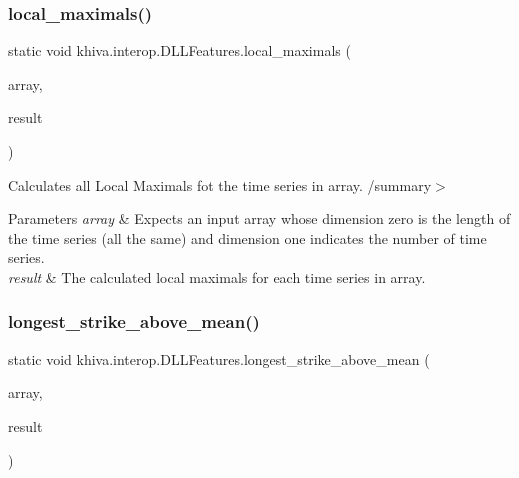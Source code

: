 \mbox{\label{classkhiva_1_1interop_1_1_d_l_l_features_a2da29b6a1c0287cb219a6a4731ce3850}} 
\subsubsection{\texorpdfstring{local\+\_\+maximals()}{local\_maximals()}}
{\footnotesize\ttfamily static void khiva.\+interop.\+D\+L\+L\+Features.\+local\+\_\+maximals (\begin{DoxyParamCaption}\item[{\mbox{[}\+In\mbox{]} ref Int\+Ptr}]{array,  }\item[{\mbox{[}\+Out\mbox{]} out Int\+Ptr}]{result }\end{DoxyParamCaption})\hspace{0.3cm}{\ttfamily [static]}}



Calculates all Local Maximals fot the time series in array. /summary$>$ 
\begin{DoxyParams}{Parameters}
{\em array} & Expects an input array whose dimension zero is the length of the time series (all the same) and dimension one indicates the number of time series.\\
\hline
{\em result} & The calculated local maximals for each time series in array.\\
\hline
\end{DoxyParams}


\mbox{\label{classkhiva_1_1interop_1_1_d_l_l_features_a5f10b0f0c8a164e833332bf8dadc4be8}} 
\subsubsection{\texorpdfstring{longest\+\_\+strike\+\_\+above\+\_\+mean()}{longest\_strike\_above\_mean()}}
{\footnotesize\ttfamily static void khiva.\+interop.\+D\+L\+L\+Features.\+longest\+\_\+strike\+\_\+above\+\_\+mean (\begin{DoxyParamCaption}\item[{\mbox{[}\+In\mbox{]} ref Int\+Ptr}]{array,  }\item[{\mbox{[}\+Out\mbox{]} out Int\+Ptr}]{result }\end{DoxyParamCaption})\hspace{0.3cm}{\ttfamily [static]}}



